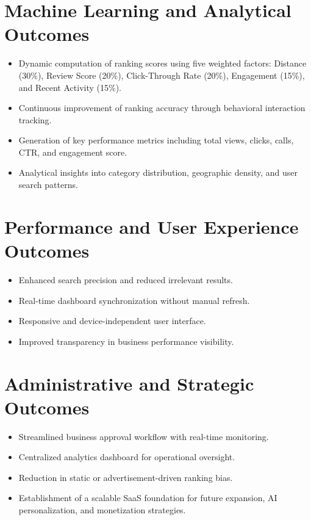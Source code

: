 \documentclass[12pt,a4paper]{report}
\begin{document}
\section{ Machine Learning and Analytical Outcomes}

\begin{itemize}

\item Dynamic computation of ranking scores using five weighted factors: Distance (30\%), Review Score (20\%), Click-Through Rate (20\%), Engagement (15\%), and Recent Activity (15\%).

\item Continuous improvement of ranking accuracy through behavioral interaction tracking.

\item Generation of key performance metrics including total views, clicks, calls, CTR, and engagement score.

\item Analytical insights into category distribution, geographic density, and user search patterns.

\end{itemize}

\section{ Performance and User Experience Outcomes}

\begin{itemize}

\item Enhanced search precision and reduced irrelevant results.

\item Real-time dashboard synchronization without manual refresh.

\item Responsive and device-independent user interface.

\item Improved transparency in business performance visibility.

\end{itemize}

\section{Administrative and Strategic Outcomes}

\begin{itemize}

\item Streamlined business approval workflow with real-time monitoring.

\item Centralized analytics dashboard for operational oversight.

\item Reduction in static or advertisement-driven ranking bias.

\item Establishment of a scalable SaaS foundation for future expansion, AI personalization, and monetization strategies.

\end{itemize}
\end{document}
